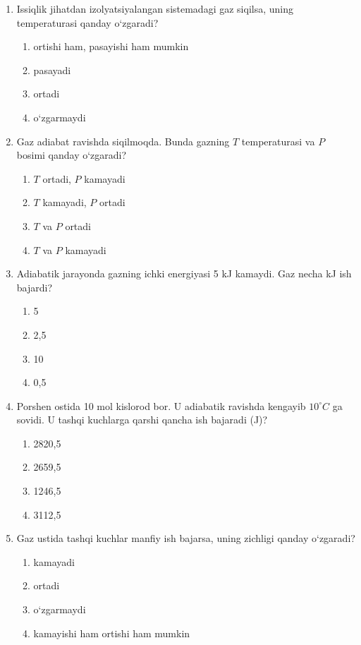 \begin{enumerate}
\item Issiqlik jihatdan izolyatsiyalangan sistemadagi gaz siqilsa, uning temperaturasi qanday o‘zgaradi?
\begin{enumerate}[label=\Alph*)]
\item ortishi ham, pasayishi ham mumkin
\item pasayadi
\item ortadi
\item o‘zgarmaydi
\end{enumerate}

\item Gaz adiabat ravishda siqilmoqda. Bunda gazning $T$ temperaturasi va $P$ bosimi qanday o‘zgaradi?
\begin{enumerate}[label=\Alph*)]
\item $T$ ortadi, $P$ kamayadi
\item $T$ kamayadi, $P$ ortadi
\item $T$ va $P$ ortadi
\item $T$ va $P$ kamayadi
\end{enumerate}

\item Adiabatik jarayonda gazning ichki energiyasi 5 kJ kamaydi. Gaz necha kJ ish bajardi?
\begin{enumerate}[label=\Alph*)]
\item 5
\item 2,5
\item 10
\item 0,5
\end{enumerate}

\item Porshen ostida 10 mol kislorod bor. U adiabatik ravishda kengayib $10^\circ C$ ga sovidi. U tashqi kuchlarga qarshi qancha ish bajaradi (J)?
\begin{enumerate}[label=\Alph*)]
\item 2820,5
\item 2659,5
\item 1246,5
\item 3112,5
\end{enumerate}

\item Gaz ustida tashqi kuchlar manfiy ish bajarsa, uning zichligi qanday o‘zgaradi?
\begin{enumerate}[label=\Alph*)]
\item kamayadi
\item ortadi
\item o‘zgarmaydi
\item kamayishi ham ortishi ham mumkin
\end{enumerate}


\end{enumerate}
